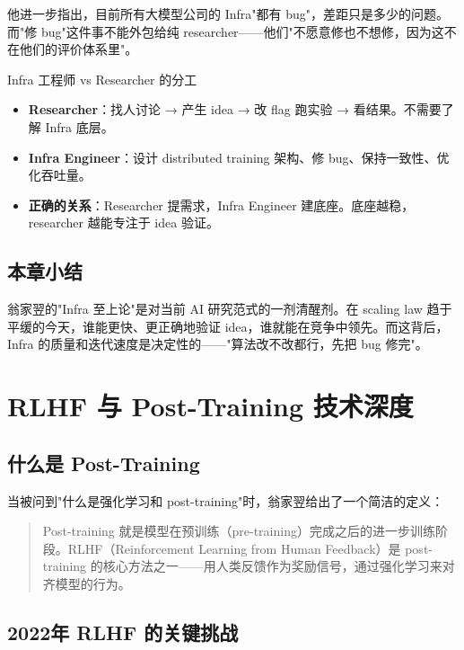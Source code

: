 \documentclass[a4paper]{article}
\begin{document}
他进一步指出，目前所有大模型公司的 Infra"都有 bug"，差距只是多少的问题。而"修 bug"这件事不能外包给纯 researcher——他们"不愿意修也不想修，因为这不在他们的评价体系里"。

\begin{knowledgebox}{Infra 工程师 vs Researcher 的分工}

\begin{itemize}
\item \textbf{Researcher}：找人讨论 → 产生 idea → 改 flag 跑实验 → 看结果。不需要了解 Infra 底层。
\item \textbf{Infra Engineer}：设计 distributed training 架构、修 bug、保持一致性、优化吞吐量。
\item \textbf{正确的关系}：Researcher 提需求，Infra Engineer 建底座。底座越稳，researcher 越能专注于 idea 验证。
\end{itemize}
\end{knowledgebox}


\subsection{本章小结}
翁家翌的"Infra 至上论"是对当前 AI 研究范式的一剂清醒剂。在 scaling law 趋于平缓的今天，谁能更快、更正确地验证 idea，谁就能在竞争中领先。而这背后，Infra 的质量和迭代速度是决定性的——"算法改不改都行，先把 bug 修完"。

\section{RLHF 与 Post-Training 技术深度}

\subsection{什么是 Post-Training}

当被问到"什么是强化学习和 post-training"时，翁家翌给出了一个简洁的定义：

\begin{quote}
Post-training 就是模型在预训练（pre-training）完成之后的进一步训练阶段。RLHF（Reinforcement Learning from Human Feedback）是 post-training 的核心方法之一——用人类反馈作为奖励信号，通过强化学习来对齐模型的行为。
\end{quote}

\subsection{2022年 RLHF 的关键挑战}
\end{document}
